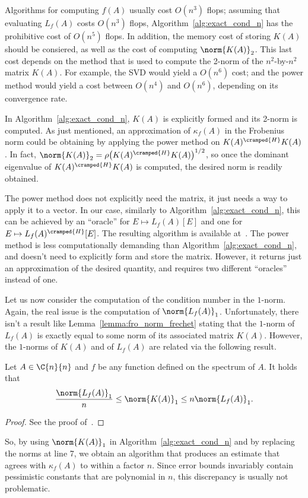 Algorithms for computing $f(A)$ usually cost $O(n^3)$ flops; assuming that evaluating $L_f(A)$ costs $O(n^3)$ flops, Algorithm~\ref{alg:exact_cond_n} has the prohibitive cost of $O(n^5)$ flops. In addition, the memory cost of storing $K(A)$ should be consiered, as well as the cost of computing $\norm{K(A)}_2$. This last cost depends on the method that is used to compute the 2-norm of the $n^2$-by-$n^2$ matrix $K(A)$. For example, the SVD would yield a $O(n^6)$ cost; and the power method would yield a cost between $O(n^4)$ and $O(n^6)$, depending on its convergence rate.

In Algorithm~\ref{alg:exact_cond_n}, $K(A)$ is explicitly formed and its 2-norm is computed. %
As just mentioned, an approximation of $\kappa_f(A)$ in the Frobenius norm could be obtaining by applying the power method on $K(A)^{\cramped{H}}K(A)$. In fact, $\norm{K(A)}_2=\rho\big(K(A)^{\cramped{H}}K(A)\big)^{1/2}$, so once the dominant eigenvalue of $K(A)^{\cramped{H}}K(A)$ is computed, the desired norm is readily obtained.

The power method does not explicitly need the matrix, it just needs a way to apply it to a vector. In our case, similarly to Algorithm~\ref{alg:exact_cond_n}, this can be achieved by an ``oracle'' for $E\mapsto L_f(A)[E]$ and one for $E\mapsto L_f(A)^{\cramped{H}}[E]$. The resulting algorithm is available at~\cite[Alg.~3.20]{higham:matfun_book}. The power method is less computationally demanding than Algorithm~\ref{alg:exact_cond_n}, and doesn't need to explicitly form and store the matrix. However, it returns just an approximation of the desired quantity, and requires two different ``oracles'' instead of one.
\smallskip 

Let us now consider the computation of the condition number in the $1$-norm. Again, the real issue is the computation of $\norm{L_f(A)}_1$. Unfortunately, there isn't a result like Lemma~\ref{lemma:fro_norm_frechet} stating that the $1$-norm of $L_f(A)$ is exactly equal to some norm of its associated matrix $K(A)$. However, the $1$-norms of $K(A)$ and of $L_f(A)$ are related via the following result.
\begin{lemma}
	Let $A\in\C{n}{n}$ and $f$ be any function defined on the spectrum of $A$. It holds that
	\[
		\frac{\norm{L_f(A)}_1}{n}\le\norm{K(A)}_1\le n\norm{L_f(A)}_1.
	\]
\end{lemma}
\begin{proof}
	See the proof of~\cite[Lemma~3.18]{higham:matfun_book}.
\end{proof}
So, by using $\norm{K(A)}_1$ in Algorithm~\ref{alg:exact_cond_n} and by replacing the norms at line 7, we obtain an algorithm that produces an estimate that agrees with $\kappa_f(A)$ to within a factor $n$. Since error bounds invariably contain pessimistic constants that are polynomial in $n$, this discrepancy is usually not problematic. 


